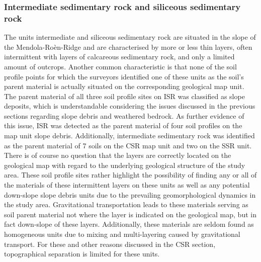 \documentclass[preprint,12pt,authoryear]{elsarticle}
\begin{document}
\subsubsection{Intermediate sedimentary rock and siliceous sedimentary rock}
The units intermediate and siliceous sedimentary rock are situated in the slope of the Mendola-Ro\`en-Ridge and are characterised by  more or less thin layers, often intermittent with layers of calcareous sedimentary rock, and only a limited amount of outcrops. Another common characteristic is that none of the soil profile points for which the surveyors identified one of these units as the soil's parent material is actually situated on the corresponding geological map unit. The parent material of all three soil profile sites on ISR was classified as slope deposits, which is understandable considering the issues discussed in the previous sections regarding slope debris and weathered bedrock. As further evidence of this issue, ISR was detected as the parent material of four soil profiles on the map unit slope debris. Additionally, intermediate sedimentary rock was identified as the parent material of 7 soils on the CSR map unit and two on the SSR unit. There is of course no question that the layers are correctly located on the geological map with regard to the underlying geological structure of the study area. These soil profile sites rather highlight the possibility of finding any or all of the materials of these intermittent layers on these units as well as any potential down-slope slope debris units due to the prevailing geomorphological dynamics in the study area. Gravitational transportation leads  to these materials serving as soil parent material not where the layer is indicated on the geological map, but in fact down-slope of these layers. Additionally, these materials are seldom found as homogeneous units due to mixing and multi-layering caused by gravitational transport. For these and other reasons discussed in the CSR section, topographical separation is limited for these units. 
\end{document}
